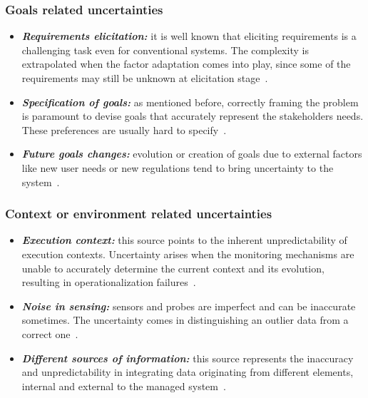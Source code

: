 \subsubsection{Goals related uncertainties}
\begin{itemize}
\item \textbf{\textit{Requirements elicitation:}} it is well known that eliciting requirements is a challenging task even for conventional systems. The complexity is extrapolated when the factor adaptation comes into play, since some of the requirements may still be unknown at elicitation stage~\cite{sutcliffe2013requirements}.

\item \textbf{\textit{Specification of goals:}} as mentioned before, correctly framing the problem is paramount to devise goals that accurately represent the stakeholders needs. These preferences are usually hard to specify~\cite{KM11}.

\item \textbf{\textit{Future goals changes:}} evolution or creation of goals due to external factors like new user needs or new regulations tend to bring uncertainty to the system~\cite{garlan2010software}.
\end{itemize}

\subsubsection{Context or environment related uncertainties}
\begin{itemize}
\item \textbf{\textit{Execution context:}} this source points to the inherent unpredictability of execution contexts. Uncertainty arises when the monitoring mechanisms are unable to accurately determine the current context and its evolution, resulting in operationalization failures~\cite{rodrigues2019enhancing,garlan2010software}.

\item \textbf{\textit{Noise in sensing:}} sensors and probes are imperfect and can be inaccurate sometimes. The uncertainty comes in distinguishing an outlier data from a correct one~\cite{EsfahaniM10}.

\item \textbf{\textit{Different sources of information:}} this source represents the inaccuracy and unpredictability in integrating data originating from different elements, internal and external to the managed system~\cite{cheung2007identifying}.
\end{itemize}

